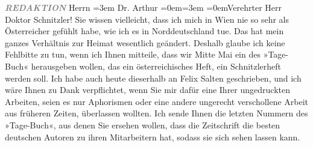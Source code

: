 \begin{ledgroupsized}[t]{13cm}
           \textcolor{gray}{\textbf{\emph{REDAKTION}}}\pend
           \pstart
           Herrn\pend
           \leftskip=3em{}\pstart
           \noindent{}Dr. Arthur \pend
           \leftskip=0em{}\leftskip=3em{}\pstart
           \pend
           \leftskip=0em{}\pstart\center{}Verehrter Herr \introOben{}Doktor\introOben{}
                  Schnitzler!\pend\pstart
           Sie wissen vielleicht, dass ich mich in Wien nie so
               sehr als Österreicher gefühlt habe, wie ich es in
                  Norddeutschland tue. Das hat mein ganzes
               Verhältnis zur Heimat wesentlich geändert. Deshalb glaube ich keine Fehlbitte zu tun,
               wenn ich Ihnen mitteile, dass wir Mitte Mai ein \label{K_L02378_1v}\label{K_L02378_1h} des »Tage-Buch«
               herausgeben wollen, das ein österreichisches Heft,
               ein Schnitzlerheft werden soll. Ich habe auch heute dieserhalb an Felix Salten geschrieben, und ich wäre Ihnen zu Dank
               verpflichtet, wenn Sie mir dafür eine Ihrer ungedruckten Arbeiten, seien es nur
               Aphorismen oder eine andere ungerecht verschollene Arbeit aus früheren Zeiten,
               überlassen wollten. Ich sende Ihnen die letzten Nummern des »Tage-Buch«, aus denen Sie ersehen wollen, dass die Zeitschrift die
               besten deutschen Autoren zu ihren Mitarbeitern hat, sodass sie sich sehen lassen
               kann.\pend
           \pstart

\end{ledgroupsized}
